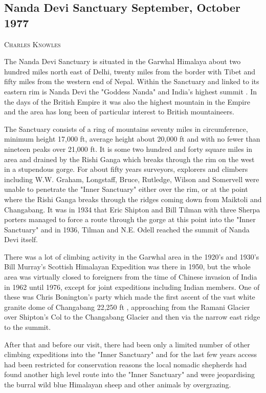 \documentclass[a5paper,openany,font 10pt]{scrbook}
\makeatletter
\newcommand{\chapterauthor}[1]{%
{\parindent0pt\vspace*{-5pt}%
\linespread{1.1}\large\scshape#1%
\par\nobreak\vspace*{35pt}}
\@afterheading%
}
\makeatother
\begin{document}
\subsection{Nanda Devi Sanctuary   September, October 1977}
\label{sec:orgba5c8d2}
\chapterauthor{Charles Knowles}

The Nanda Devi Sanctuary is situated in the Garwhal Himalaya
about two hundred miles north east of Delhi, twenty miles from
the border with Tibet and fifty miles from the western end of
Nepal. Within the Sanctuary and linked to its eastern rim is
Nanda Devi  the "Goddess Nanda" and India's highest summit . In
the days of the British Empire it was also the highest mountain
in the Empire and the area has long been of particular interest
to British mountaineers.

The Sanctuary consists of a ring of mountains seventy miles
in circumference, minimum height 17,000 ft, average height about
20,000 ft and with no fewer than nineteen peaks over 21,000 ft.
It is some two hundred and forty square miles in area and drained
by the Rishi Ganga which breaks through the rim on the west in a
stupendous gorge. For about fifty years surveyors, explorers and
climbers  including W.W. Graham, Longstaff, Bruce, Rutledge,
Wilson and Somervell  were unable to penetrate the "Inner
Sanctuary" either over the rim, or at the point where the Rishi
Ganga breaks through the ridges coming down from Maiktoli and
Changabang. It was in 1934 that Eric Shipton and Bill Tilman with
three Sherpa porters managed to force a route through the gorge
at this point into the "Inner Sanctuary" and in 1936, Tilman and
N.E. Odell reached the summit of Nanda Devi itself.

There was a lot of climbing activity in the Garwhal area in
the 1920's and 1930's  Bill Murray's Scottish Himalayan
Expedition was there in 1950, but the whole area was virtually
closed to foreigners from the time of Chinese invasion of India
in 1962 until 1976, except for joint expeditions including Indian
members. One of these was Chris Bonington's party which made the
first ascent of the vast white granite dome of Changabang
 22,250 ft , approaching from the Ramani Glacier over Shipton's
Col to the Changabang Glacier and then via the narrow east ridge
to the summit.

After that and before our visit, there had been only a
limited number of other climbing expeditions into the "Inner
Sanctuary" and for the last few years access had been restricted
for conservation reasons   the local nomadic shepherds had found
another high level route into the "Inner Sanctuary"  and were
jeopardising the burral  wild blue Himalayan sheep  and other
animals by overgrazing.
\end{document}
